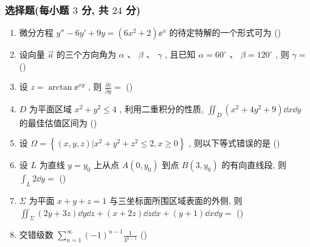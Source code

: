 \subsubsection{选择题(每小题 $3$ 分, 共 $24$ 分)}
\begin{enumerate}
	\item 微分方程 $y''-6 y'+9 y=\left(6 x^{2}+2\right) \ee^{x}$ 的待定特解的一个形式可为 (\hspace{1pc})
	
	\item 设向量 $\vec{a}$ 的三个方向角为 $\alpha$ 、 $\beta$ 、 $\gamma$ , 且已知 $\alpha=60^{\circ}$ 、 $\beta=120^{\circ}$ , 则 $\gamma=$ (\hspace{1pc})
	
	\item 设 $z=\arctan \ee^{x y}$ , 则 $\frac{\partial z}{\partial y}=$ (\hspace{1pc})
	
	\item $D$ 为平面区域 $x^{2}+y^{2} \leq 4$ , 利用二重积分的性质, $\iint_{D}\left(x^{2}+4 y^{2}+9\right) \dd x \dd y$ 的最佳估值区间为 (\hspace{1pc})
	\fourch{$[36 \uppi, 52 \uppi]$}{$[36 \uppi, 100 \uppi]$}{$[52 \uppi, 100 \uppi]$}{$[9 \uppi, 25 \uppi]$}
	
	\item 设 $\Omega=\left\{(x, y, z) | x^{2}+y^{2}+z^{2} \leq 2, x \geq 0\right\}$ , 则以下等式错误的是 (\hspace{1pc})
	
	\item 设 $L$ 为直线 $y=y_0$ 上从点 $A(0,y_0)$ 到点 $B(3,y_0)$ 的有向直线段, 则 $\int_{L} 2 \dd y=$ (\hspace{1pc})
	
	\item $\Sigma$ 为平面 $x+y+z=1$ 与三坐标面所围区域表面的外侧, 则 $\iint_{\Sigma}(2 y+3 z) \dd y \dd z+(x+2 z) \dd z \dd x+(y+1) \dd x \dd y=$ (\hspace{1pc})
	
	\item 交错级数 $\sum_{n=1}^{\infty}(-1)^{n-1} \frac{1}{3^{n-1}}$ (\hspace{1pc})
\end{enumerate}

